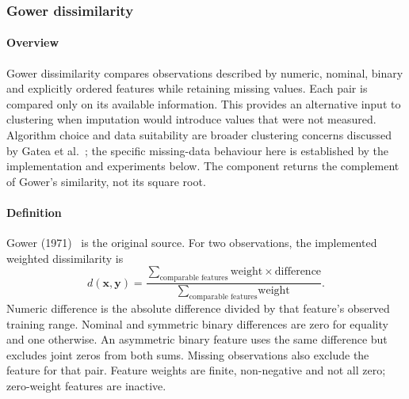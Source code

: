 

\subsubsection{Gower dissimilarity}
\label{sec:measure:gower}

\paragraph{Overview}
\label{sec:measure:gower:overview}
Gower dissimilarity compares observations described by numeric, nominal,
binary and explicitly ordered features while retaining missing values.
Each pair is compared only on its available information. This provides
an alternative input to clustering when imputation would introduce values
that were not measured. Algorithm choice and data suitability are broader
clustering concerns discussed by Gatea et al.~\cite{ref_3}; the specific
missing-data behaviour here is established by the implementation and
experiments below. The component returns the complement of Gower's
similarity, not its square root.

\paragraph{Definition}
\label{sec:measure:gower:definition}
Gower (1971)~\cite{ref_32} is the original source. For two observations,
the implemented weighted dissimilarity is
\begin{equation}
 d(\mathbf{x},\mathbf{y}) =
 \frac{\displaystyle\sum_{\text{comparable features}}
       \text{weight}\times\text{difference}}
      {\displaystyle\sum_{\text{comparable features}}\text{weight}}.
 \label{eq:gower:definition}
\end{equation}
Numeric difference is the absolute difference divided by that feature's
observed training range. Nominal and symmetric binary differences are zero
for equality and one otherwise. An asymmetric binary feature uses the same
difference but excludes joint zeros from both sums. Missing observations
also exclude the feature for that pair. Feature weights are finite,
non-negative and not all zero; zero-weight features are inactive.

